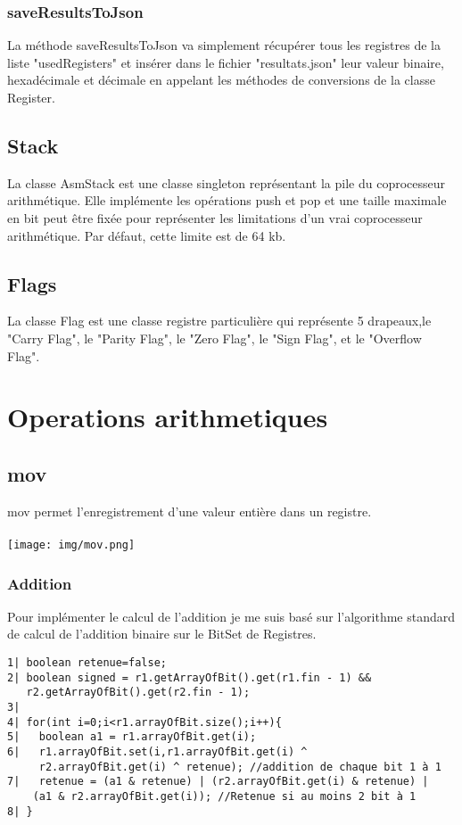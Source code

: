 \documentclass{article}
\begin{document}
\subsubsection{saveResultsToJson}

La méthode saveResultsToJson va simplement récupérer tous les registres de la liste "usedRegisters" et insérer dans le fichier "resultats.json"
leur valeur binaire, hexadécimale et décimale en appelant les méthodes de conversions de la classe Register.


\subsection{Stack}

La classe AsmStack est une classe singleton représentant la pile du coprocesseur arithmétique. Elle implémente les opérations push et pop et
une taille maximale en bit peut être fixée pour représenter les limitations d'un vrai coprocesseur arithmétique. Par défaut, cette limite est de 64 kb.

\subsection{Flags}

La classe Flag est une classe registre particulière qui représente 5 drapeaux,le "Carry Flag", le "Parity Flag", le "Zero Flag", le "Sign Flag", et le "Overflow Flag".

\section{Operations arithmetiques}
\subsection{mov}
mov permet l'enregistrement d'une valeur entière dans un registre.
\\
\\
\texttt{[image: img/mov.png]}

\newpage
\subsubsection{Addition}
Pour implémenter le calcul de l'addition je me suis basé sur l'algorithme standard de calcul de l'addition binaire sur le BitSet de Registres.

\begin{verbatim}
1| boolean retenue=false;
2| boolean signed = r1.getArrayOfBit().get(r1.fin - 1) &&
   r2.getArrayOfBit().get(r2.fin - 1);
3|
4| for(int i=0;i<r1.arrayOfBit.size();i++){
5|   boolean a1 = r1.arrayOfBit.get(i);
6|   r1.arrayOfBit.set(i,r1.arrayOfBit.get(i) ^
     r2.arrayOfBit.get(i) ^ retenue); //addition de chaque bit 1 à 1
7|   retenue = (a1 & retenue) | (r2.arrayOfBit.get(i) & retenue) |
    (a1 & r2.arrayOfBit.get(i)); //Retenue si au moins 2 bit à 1
8| }
\end{verbatim}
\end{document}
